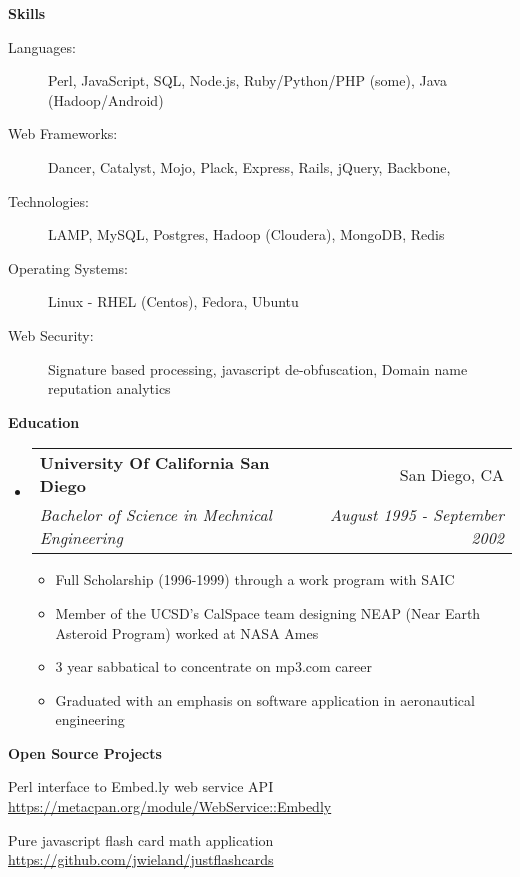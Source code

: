 \documentclass[letterpaper,11pt]{article}
\makeatletter
\newcommand{\resitem}[1]{\item #1 \vspace{-2pt}}
\newcommand{\resheading}[1]{{\large \colorbox{mygrey}{\begin{minipage}{\textwidth}{\textbf{#1 \vphantom{p\^{E}}}}\end{minipage}}}}
\newcommand{\ressubheading}[4]{
  \begin{tabular*}{7.0in}{l@{\extracolsep{\fill}}r}
    \textbf{#1} & #2 \\
    \textit{#3} & \textit{#4} \\
  \end{tabular*}\vspace{-6pt}}
\makeatother
\begin{document}
\resheading{Skills}

\begin{description}
\item[Languages:]
  Perl, JavaScript, SQL, Node.js, Ruby/Python/PHP (some), Java (Hadoop/Android)
\item[Web Frameworks:]
  Dancer, Catalyst, Mojo, Plack, Express, Rails, jQuery, Backbone,
\item[Technologies:]
  LAMP, MySQL, Postgres, Hadoop (Cloudera), MongoDB, Redis
\item[Operating Systems:]
  Linux - RHEL (Centos), Fedora, Ubuntu
\item[Web Security:]
  Signature based processing, javascript de-obfuscation, Domain name reputation analytics
\end{description}

\resheading{Education}
\begin{itemize}
\item
  \ressubheading{University Of California San Diego}{San Diego, CA}{Bachelor of Science in Mechnical Engineering}{August 1995 - September 2002}
  \begin{itemize}
    \resitem{Full Scholarship (1996-1999) through a work program with SAIC }
    \resitem{Member of the UCSD's CalSpace team designing NEAP (Near Earth Asteroid Program) worked at NASA Ames}
    \resitem{3 year sabbatical to concentrate on mp3.com career} 
    \resitem{Graduated with an emphasis on software application in aeronautical engineering}
  \end{itemize}
\end{itemize}


\resheading{Open Source Projects}
\begin{description}
\item Perl interface to Embed.ly web service API \url{https://metacpan.org/module/WebService::Embedly}
\item Pure javascript flash card math application \url{https://github.com/jwieland/justflashcards}
\end{description}
\end{document}
